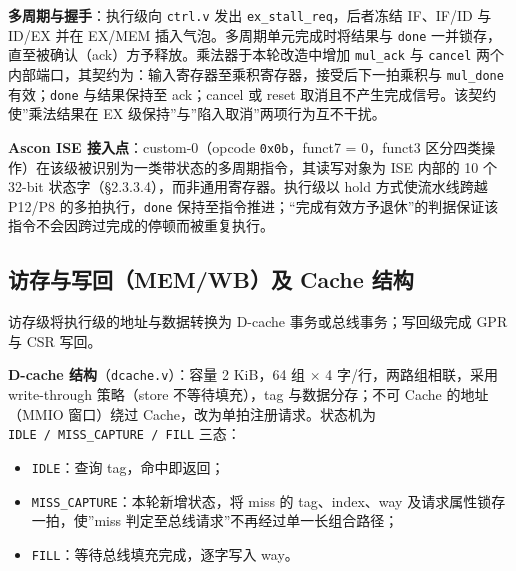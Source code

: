 \textbf{多周期与握手}：执行级向 \texttt{ctrl.\allowbreak{}v} 发出 \texttt{ex\_\allowbreak{}stall\_\allowbreak{}req}，后者冻结 IF、IF/ID 与 ID/EX 并在 EX/MEM 插入气泡。多周期单元完成时将结果与 \texttt{done} 一并锁存，直至被确认（ack）方予释放。乘法器于本轮改造中增加 \texttt{mul\_\allowbreak{}ack} 与 \texttt{cancel} 两个内部端口，其契约为：输入寄存器至乘积寄存器，接受后下一拍乘积与 \texttt{mul\_\allowbreak{}done} 有效；\texttt{done} 与结果保持至 ack；cancel 或 reset 取消且不产生完成信号。该契约使''乘法结果在 EX 级保持''与''陷入取消''两项行为互不干扰。

\textbf{Ascon ISE 接入点}：custom-0（opcode \texttt{0x0b}，funct7 = 0，funct3 区分四类操作）在该级被识别为一类带状态的多周期指令，其读写对象为 ISE 内部的 10 个 32-bit 状态字（§2.3.3.4），而非通用寄存器。执行级以 hold 方式使流水线跨越 P12/P8 的多拍执行，\texttt{done} 保持至指令推进；``完成有效方予退休''的判据保证该指令不会因跨过完成的停顿而被重复执行。


\Needspace{85pt}

\subsection{访存与写回（MEM/WB）及 Cache 结构}\label{ux8bbfux5b58ux4e0eux5199ux56dememwbux53ca-cache-ux7ed3ux6784}

访存级将执行级的地址与数据转换为 D-cache 事务或总线事务；写回级完成 GPR 与 CSR 写回。

\textbf{D-cache 结构}（\texttt{dcache.\allowbreak{}v}）：容量 2 KiB，64 组 $\times$ 4 字/行，两路组相联，采用 write-through 策略（store 不等待填充），tag 与数据分存；不可 Cache 的地址（MMIO 窗口）绕过 Cache，改为单拍注册请求。状态机为 \texttt{IDLE\ /\allowbreak{}\ MISS\_\allowbreak{}CAPTURE\ /\allowbreak{}\ FILL} 三态：

\begin{itemize}
\tightlist
\item
  \texttt{IDLE}：查询 tag，命中即返回；
\item
  \texttt{MISS\_\allowbreak{}CAPTURE}：本轮新增状态，将 miss 的 tag、index、way 及请求属性锁存一拍，使''miss 判定至总线请求''不再经过单一长组合路径；
\item
  \texttt{FILL}：等待总线填充完成，逐字写入 way。
\end{itemize}

